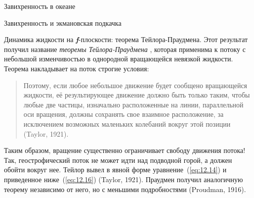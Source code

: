 \begin{chapter}{Завихренность в океане}
\begin{section}{Завихренность и экмановская подкачка}
\begin{paragraph}{Динамика жидкости на \textbf{\textit{f}}-плоскости: 
теорема Тейлора-Праудмена.}
Этот результат получил название \emph{теоремы Тейлора-Праудмена}%
, которая применима к потоку с 
небольшой изменчивостью в однородной вращающейся невязкой жидкости. 
Теорема накладывает на поток строгие условия:
\begin{quotation}
Поэтому, если любое небольшое движение будет сообщено вращающейся
жидкости, её результирующее движение должно быть только таким,
чтобы любые две частицы, изначально расположенные на линии,
параллельной оси вращения, должны сохранять свое взаимное
расположение, за исключением возможных маленьких колебаний вокруг этой
позиции (Taylor, 1921).
\end{quotation}
Таким образом, вращение существенно ограничивает свободу движения потока!
Так, геострофический поток%
 не может идти над 
подводной горой, а должен обойти вокруг нее. Тейлор вывел в явной форме 
уравнение~(\ref{eq:12.14}) и приведенное ниже~(\ref{eq:12.16}) (Taylor, 1921). 
Праудмен получил аналогичную теорему независимо от него, но с меньшими
подробностями (Proudman, 1916).
%


\end{paragraph}
\end{section}
\end{chapter}
